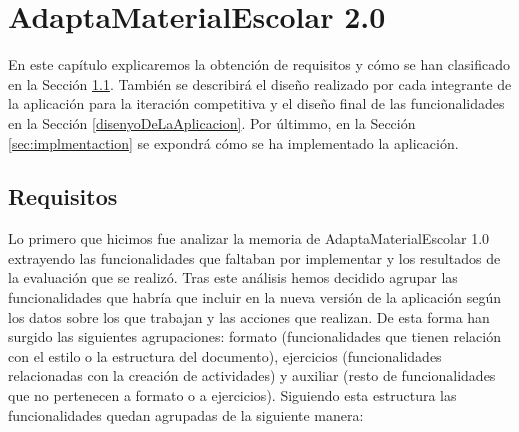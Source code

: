 \chapter{AdaptaMaterialEscolar 2.0}
\label{cap:AdaptaMaterialEscolar2.0}
En este capítulo explicaremos la obtención de requisitos y cómo se han clasificado en la Sección \ref{cap:requisitos}. También se describirá el diseño realizado por cada integrante de la aplicación para la iteración competitiva y el diseño final de las funcionalidades en la Sección \ref{disenyoDeLaAplicacion}. Por últimmo, en la Sección \ref{sec:implmentaction} se expondrá cómo se ha implementado la aplicación.

\section{Requisitos}
\label{cap:requisitos}

Lo primero que hicimos fue analizar la memoria de AdaptaMaterialEscolar 1.0 \citep*{AdaptaMaterialEscolar1.0} extrayendo las funcionalidades que faltaban por implementar y los resultados de la evaluación que se realizó. Tras este análisis hemos decidido agrupar las funcionalidades que habría que incluir en la nueva versión de la aplicación según los datos sobre los que trabajan y las acciones que realizan. De esta forma han surgido las siguientes agrupaciones: formato (funcionalidades que tienen relación con el estilo o la estructura del documento), ejercicios (funcionalidades relacionadas con la creación de actividades) y auxiliar (resto de funcionalidades que no pertenecen a formato o a ejercicios). Siguiendo esta estructura las funcionalidades quedan agrupadas de la siguiente manera:
\\

